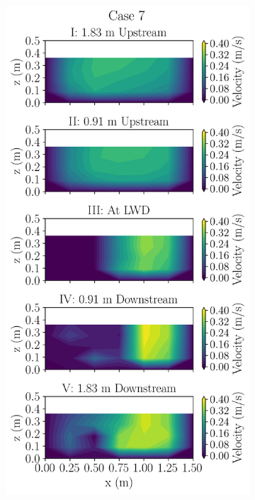 \documentclass[preview, border=2pt]{standalone}
\begin{document}
\begin{figure}
\begin{subfigure}[b]{0.24\textwidth}
     \end{subfigure}
     \hfill     
     \begin{subfigure}[b]{0.24\textwidth}
         \centering
         \caption{}
         \includegraphics[width=\textwidth]{Case7_velocity_contours.png}

\end{subfigure}
\end{figure}
\end{document}
